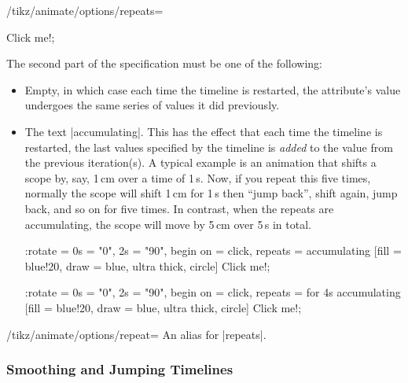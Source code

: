 \begin{key}{/tikz/animate/options/repeats=}
\begin{itemize}
\begin{codeexample}[imagesource={standalone/pgfmanual-en-tikz-animations-animation-73.svg}]
    [fill = blue!20, draw = blue, ultra thick, circle] {Click me!};
\end{codeexample}
    \end{itemize}
    The second part of the specification must be one of the following:
    \begin{itemize}
        \item Empty, in which case each time the timeline is restarted, the
            attribute's value undergoes the same series of values it did
            previously.
        \item The text |accumulating|. This has the effect that each time the
            timeline is restarted, the last values specified by the timeline is
            \emph{added} to the value from the previous iteration(s). A typical
            example is an animation that shifts a scope by, say, 1\,cm over a
            time of 1\,s. Now, if you repeat this five times, normally the
            scope will shift 1\,cm for 1\,s then ``jump back'', shift again,
            jump back, and so on for five times. In contrast, when the repeats
            are accumulating, the scope will move by 5\,cm over 5\,s in total.
\begin{codeexample}[imagesource={standalone/pgfmanual-en-tikz-animations-animation-74.svg}]
\tikz \node :rotate = { 0s = "0", 2s = "90", begin on = click,
                        repeats = accumulating }
    [fill = blue!20, draw = blue, ultra thick, circle] {Click me!};
\end{codeexample}
\begin{codeexample}[imagesource={standalone/pgfmanual-en-tikz-animations-animation-75.svg}]
\tikz \node :rotate = { 0s = "0", 2s = "90", begin on = click,
                        repeats = for 4s accumulating }
    [fill = blue!20, draw = blue, ultra thick, circle] {Click me!};
\end{codeexample}
    \end{itemize}
\end{key}

\begin{key}{/tikz/animate/options/repeat=}
    An alias for |repeats|.
\end{key}


\subsubsection{Smoothing and Jumping Timelines}
\label{section-anim-smooth}

